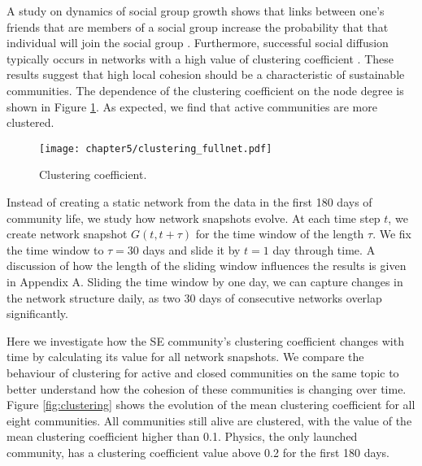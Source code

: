 A study on dynamics of social group growth shows that links between one’s friends that are members of a social group increase the probability that that individual will join the social group \cite{backstrom2006group}. Furthermore, successful social diffusion typically occurs in networks with a high value of clustering coefficient \cite{centola2007cascade}. These results suggest that high local cohesion should be a characteristic of sustainable communities. The dependence of the clustering coefficient on the node degree is shown in Figure \ref{fig:fullclustering}. As expected, we find that active communities are more clustered.

\begin{figure}[h]
	\centering
	\texttt{[image: chapter5/clustering\_fullnet.pdf]}
	\caption{Clustering coefficient.}
	\label{fig:fullclustering}
\end{figure}

Instead of creating a static network from the data in the first 180 days of community life, we study how network snapshots evolve. At each time step $t$, we create network snapshot $G(t, t+\tau)$ for the time window of the length $\tau$. We fix the time window to $\tau=30$ days and slide it by $t=1$ day through time. A discussion of how the length of the sliding window influences the results is given in Appendix A. Sliding the time window by one day, we can capture changes in the network structure daily, as two 30 days of consecutive networks overlap significantly. 

Here we investigate how the SE community’s clustering coefficient changes with time by calculating its value for all network snapshots. We compare the behaviour of clustering for active and closed communities on the same topic to better understand how the cohesion of these communities is changing over time. Figure \ref{fig:clustering} shows the evolution of the mean clustering coefficient for all eight communities. All communities still alive are clustered, with the value of the mean clustering coefficient higher than 0.1. Physics, the only launched community, has a clustering coefficient value above 0.2 for the first 180 days.

